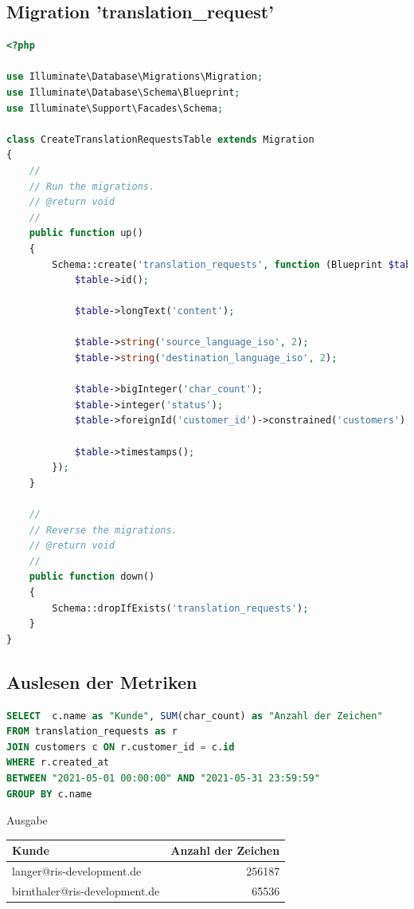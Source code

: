 \newpage
\subsection{Migration 'translation\_request'}
\label{sec:migration_translation_request}
\begin{lstlisting}[language=php]
<?php

use Illuminate\Database\Migrations\Migration;
use Illuminate\Database\Schema\Blueprint;
use Illuminate\Support\Facades\Schema;

class CreateTranslationRequestsTable extends Migration
{
	// 
	// Run the migrations.
	// @return void
	// 
	public function up()
	{
		Schema::create('translation_requests', function (Blueprint $table) {
			$table->id();

			$table->longText('content');

			$table->string('source_language_iso', 2);
			$table->string('destination_language_iso', 2);

			$table->bigInteger('char_count');
			$table->integer('status');
			$table->foreignId('customer_id')->constrained('customers');

			$table->timestamps();
		});
	}

	// 
	// Reverse the migrations.
	// @return void
	// 
	public function down()
	{
		Schema::dropIfExists('translation_requests');
	}
}
\end{lstlisting}

\newpage
\subsection{Auslesen der Metriken}
\label{sec:sql_data}
\begin{lstlisting}[language=sql]
SELECT  c.name as "Kunde", SUM(char_count) as "Anzahl der Zeichen"
FROM translation_requests as r
JOIN customers c ON r.customer_id = c.id
WHERE r.created_at 
BETWEEN "2021-05-01 00:00:00" AND "2021-05-31 23:59:59"
GROUP BY c.name
\end{lstlisting}

Ausgabe 

\begin{tabular}{|l|r|}
    \hline
    Kunde & Anzahl der Zeichen\\
    \hline
    langer@ris-development.de & 256187\\
    birnthaler@ris-development.de & 65536\\
    \hline
\end{tabular}

